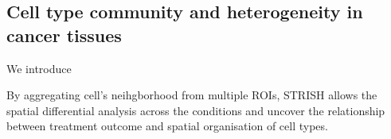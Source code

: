 \subsection{Cell type community and heterogeneity in cancer tissues}
We introduce 

By aggregating cell's neihgborhood from multiple ROIs, STRISH allows the spatial differential analysis across the  conditions and uncover the relationship between treatment outcome and spatial organisation of cell types.



% 

% 